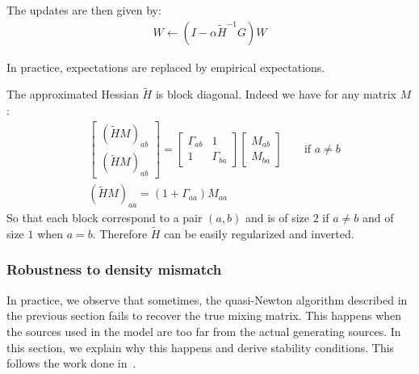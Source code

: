 The updates are then given by:
\begin{align}
  W \leftarrow (I - \alpha \tilde{H}^{-1} G) W
\end{align}

In practice, expectations are replaced by empirical expectations.

The approximated Hessian $\tilde{H}$ is block diagonal.
Indeed we have for any matrix $M$:
\begin{align}
  &\begin{bmatrix} (\tilde{H} M)_{ab} \\  (\tilde{H} M)_{ab} \end{bmatrix} = \begin{bmatrix} \Gamma_{ab} & 1 \\ 1 & \Gamma_{ba} \end{bmatrix} \begin{bmatrix} M_{ab} \\ M_{ba} \end{bmatrix} && \text{ if } a \neq b  \nonumber \\
  &(\tilde{H} M)_{aa} =  (1 + \Gamma_{aa}) M_{aa}
 \label{eq:apphess:blocks}
\end{align}
So that each block correspond to a pair $(a, b)$ and is of size $2$ if $a \neq b$ and of size $1$ when $a=b$.
Therefore $\tilde{H}$ can be easily regularized and inverted.

\subsubsection{Robustness to density mismatch}
In practice, we observe that sometimes, the quasi-Newton algorithm described in
the previous section fails to recover the true mixing matrix. This happens when the
sources used in the model are too far from the actual  generating sources.
%
In this section, we explain
why this happens and derive stability conditions. This follows the work done in~\cite{cardoso1998blind}.

